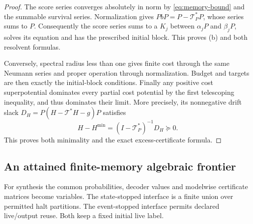 \begin{proof}
The score series converges absolutely in norm by \eqref{eq:memory-bound} and the summable survival series. Normalization gives $PbP=P-\mathcal T_P^*P$, whose series sums to $P$. Consequently the score series sums to a $K_j$ between $\alpha_jP$ and $\beta_jP$, solves its equation and has the prescribed initial block. This proves (b) and both resolvent formulas.

Conversely, spectral radius less than one gives finite cost through the same Neumann series and proper operation through normalization. Budget and targets are then exactly the initial-block conditions. Finally any positive cost superpotential dominates every partial cost potential by the first telescoping inequality, and thus dominates their limit. More precisely, its nonnegative drift slack $D_H=P(H-\mathcal T^*H-g)P$ satisfies
\[
 H-H^{\min}=(I-\mathcal T_P^*)^{-1}D_H\succeq0.
\]
This proves both minimality and the exact excess-certificate formula.
\end{proof}

\subsection{An attained finite-memory algebraic frontier}
For synthesis the common probabilities, decoder values and modelwise certificate matrices become variables. The state-stopped interface is a finite union over permitted halt partitions. The event-stopped interface permits declared live/output reuse. Both keep a fixed initial live label.

